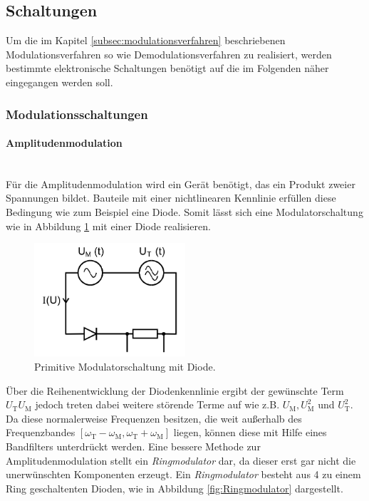 \FloatBarrier

\subsection{Schaltungen}
\label{subsec:schaltungen}
Um die im Kapitel \ref{subsec:modulationsverfahren}
beschriebenen Modulationsverfahren so wie Demodulationsverfahren zu realisiert, werden
bestimmte elektronische Schaltungen
benötigt auf die im Folgenden näher eingegangen werden soll.

\subsubsection{Modulationsschaltungen}
\label{subsubsec:modulationsschaltungen}
\paragraph{Amplitudenmodulation}
\mbox{}\\
Für die Amplitudenmodulation
wird ein Gerät benötigt, das ein
Produkt zweier Spannungen bildet.
Bauteile mit einer nichtlinearen Kennlinie
erfüllen diese Bedingung wie zum Beispiel eine
Diode.
Somit lässt sich eine Modulatorschaltung
wie in Abbildung \ref{fig:diode}
mit einer Diode realisieren.
\begin{figure}
\centering
\includegraphics[width=0.5\textwidth]{figures/diode.PNG}
\caption{Primitive Modulatorschaltung mit Diode.\cite{sample}}
\label{fig:diode}
\end{figure}
Über die Reihenentwicklung der
Diodenkennlinie ergibt der gewünschte
Term $U_{\text{T}}U_{\text{M}}$ jedoch
treten dabei weitere störende Terme
auf wie z.B. $U_{\text{M}}, U_{\text{M}}^2$ und $U_{\text{T}}^2$.
Da diese normalerweise Frequenzen
besitzen, die weit außerhalb des
Frequenzbandes $[\omega_{\text{T}}-\omega_{\text{M}},\omega_{\text{T}}+\omega_{\text{M}}]$ liegen,
können diese mit Hilfe eines Bandfilters unterdrückt werden.
Eine bessere Methode zur Amplitudenmodulation
stellt ein
\textit{Ringmodulator} dar, da dieser
erst gar nicht die unerwünschten Komponenten
erzeugt.
Ein \textit{Ringmodulator} besteht aus
4 zu einem Ring geschaltenten Dioden,
wie in Abbildung
\ref{fig:Ringmodulator} dargestellt.

